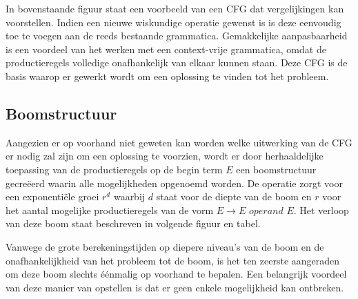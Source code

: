 \documentclass[Main.tex]{subfiles}
\begin{document}
\begin{center}
\end{center} 
In bovenstaande figuur staat een voorbeeld van een CFG dat vergelijkingen kan voorstellen. Indien een nieuwe wiskundige operatie gewenst is is deze eenvoudig toe te voegen aan de reeds bestaande grammatica. Gemakkelijke aanpasbaarheid is een voordeel van het werken met een context-vrije grammatica, omdat de productieregels volledige onafhankelijk van elkaar kunnen staan. Deze CFG is de basis waarop er gewerkt wordt om een oplossing te vinden tot het probleem.

\subsection{Boomstructuur}
Aangezien er op voorhand niet geweten kan worden welke uitwerking van de CFG er nodig zal zijn om een oplossing te voorzien, wordt er door herhaaldelijke toepassing van de productieregels op de begin term $E$ een boomstructuur gecre\"eerd waarin alle mogelijkheden opgenoemd worden. De operatie zorgt voor een exponenti\"ele groei $r^{d}$ waarbij $d$ staat voor de diepte van de boom en $r$ voor het aantal mogelijke productieregels van de vorm $E \rightarrow E$  $operand$ $ E$. Het verloop van deze boom staat beschreven in volgende figuur en tabel. %

Vanwege de grote berekeningstijden op diepere niveau's van de boom en de onafhankelijkheid van het probleem tot de boom, is het ten zeerste aangeraden om deze boom slechts \'e\'enmalig op voorhand te bepalen. Een belangrijk voordeel van deze manier van opstellen is dat er geen enkele mogelijkheid kan ontbreken. 
\end{document}
